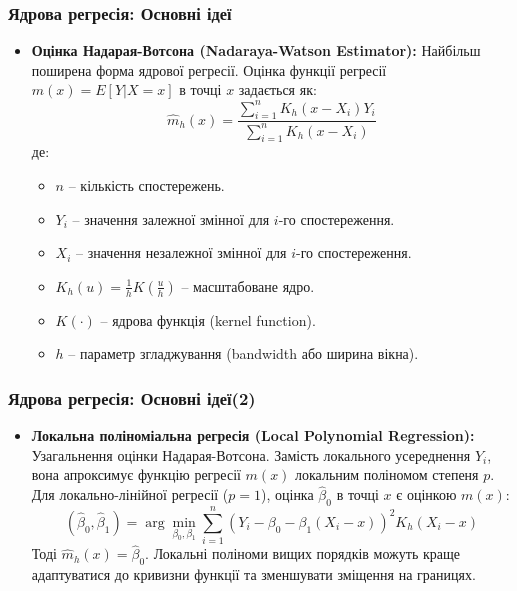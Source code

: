 ﻿\documentclass{beamer}
\begin{document}
\begin{frame}
  \frametitle{Ядрова регресія: Основні ідеї}
  \begin{itemize}
    \item \textbf{Оцінка Надарая-Вотсона (Nadaraya-Watson Estimator):}
    Найбільш поширена форма ядрової регресії. Оцінка функції регресії $m(x) = E[Y|X=x]$ в точці $x$ задається як:
    $$ \hat{m}_h(x) = \frac{\sum_{i=1}^{n} K_h(x - X_i) Y_i}{\sum_{i=1}^{n} K_h(x - X_i)} $$
    де:
    \begin{itemize}
        \item $n$ – кількість спостережень.
        \item $Y_i$ – значення залежної змінної для $i$-го спостереження.
        \item $X_i$ – значення незалежної змінної для $i$-го спостереження.
        \item $K_h(u) = \frac{1}{h}K(\frac{u}{h})$ – масштабоване ядро.
        \item $K(\cdot)$ – ядрова функція (kernel function).
        \item $h$ – параметр згладжування (bandwidth або ширина вікна).
    \end{itemize}
  \end{itemize}
\end{frame}

\begin{frame}
  \frametitle{Ядрова регресія: Основні ідеї(2)}
  \begin{itemize}
    \item \textbf{Локальна поліноміальна регресія (Local Polynomial Regression):}
    Узагальнення оцінки Надарая-Вотсона. Замість локального усереднення $Y_i$, вона апроксимує функцію регресії $m(x)$ локальним поліномом степеня $p$.
    Для локально-лінійної регресії ($p=1$), оцінка $\hat{\beta}_0$ в точці $x$ є оцінкою $m(x)$:
    $$ (\hat{\beta}_0, \hat{\beta}_1) = \arg\min_{\beta_0, \beta_1} \sum_{i=1}^{n} \left(Y_i - \beta_0 - \beta_1(X_i - x)\right)^2 K_h(X_i - x) $$
    Тоді $\hat{m}_h(x) = \hat{\beta}_0$.
    Локальні поліноми вищих порядків можуть краще адаптуватися до кривизни функції та зменшувати зміщення на границях.
  \end{itemize}
\end{frame}
\end{document}
